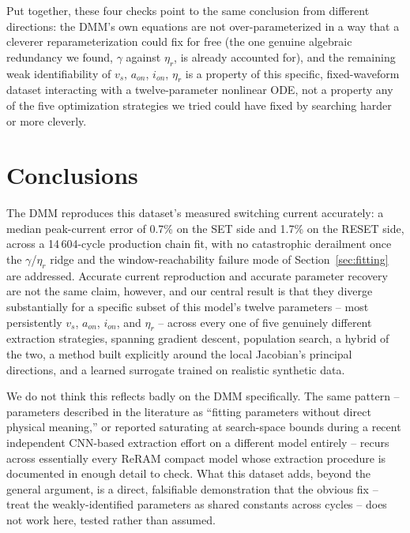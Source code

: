 \documentclass[11pt]{article}
\begin{document}
Put together, these four checks point to the same conclusion from different
directions: the DMM's own equations are not over-parameterized in a way
that a cleverer reparameterization could fix for free (the one genuine
algebraic redundancy we found, $\gamma$ against $\eta_r$, is already
accounted for), and the remaining weak identifiability of $v_s$, $a_{on}$,
$i_{on}$, $\eta_r$ is a property of this specific, fixed-waveform dataset
interacting with a twelve-parameter nonlinear ODE, not a property any of
the five optimization strategies we tried could have fixed by searching
harder or more cleverly.

\section{Conclusions}
\label{sec:conclusions}

The DMM reproduces this dataset's measured switching current accurately: a
median peak-current error of 0.7\% on the SET side and 1.7\% on the RESET
side, across a 14\,604-cycle production chain fit, with no catastrophic
derailment once the $\gamma$/$\eta_r$ ridge and the window-reachability
failure mode of Section~\ref{sec:fitting} are addressed. Accurate current
reproduction and accurate parameter recovery are not the same claim,
however, and our central result is that they diverge substantially for a
specific subset of this model's twelve parameters -- most persistently
$v_s$, $a_{on}$, $i_{on}$, and $\eta_r$ -- across every one of five
genuinely different extraction strategies, spanning gradient descent,
population search, a hybrid of the two, a method built explicitly around
the local Jacobian's principal directions, and a learned surrogate trained
on realistic synthetic data.

We do not think this reflects badly on the DMM specifically. The same
pattern -- parameters described in the literature as ``fitting parameters
without direct physical meaning,'' or reported saturating at search-space
bounds during a recent independent CNN-based extraction effort on a
different model entirely \cite{hamid2025cnn} -- recurs across essentially
every ReRAM compact model whose extraction procedure is documented in
enough detail to check. What this dataset adds, beyond the general
argument, is a direct, falsifiable demonstration that the obvious fix --
treat the weakly-identified parameters as shared constants across cycles --
does not work here, tested rather than assumed.
\end{document}
